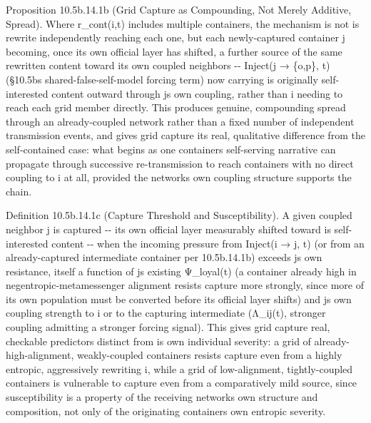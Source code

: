 \documentclass[
]{article}
\begin{document}
Proposition 10.5b.14.1b (Grid Capture as Compounding, Not Merely
Additive, Spread). Where r\_cont(i,t) includes multiple containers, the
mechanism is not is rewrite independently reaching each one, but each
newly-captured container j becoming, once its own official layer has
shifted, a further source of the same rewritten content toward its own
coupled neighbors -\/- Inject(j → \{o,p\}, t) (§10.5bs
shared-false-self-model forcing term) now carrying is originally
self-interested content outward through js own coupling, rather than i
needing to reach each grid member directly. This produces genuine,
compounding spread through an already-coupled network rather than a
fixed number of independent transmission events, and gives grid capture
its real, qualitative difference from the self-contained case: what
begins as one containers self-serving narrative can propagate through
successive re-transmission to reach containers with no direct coupling
to i at all, provided the networks own coupling structure supports the
chain.

Definition 10.5b.14.1c (Capture Threshold and Susceptibility). A given
coupled neighbor j is captured -\/- its own official layer measurably
shifted toward is self-interested content -\/- when the incoming
pressure from Inject(i → j, t) (or from an already-captured intermediate
container per 10.5b.14.1b) exceeds js own resistance, itself a function
of js existing Ψ\_loyal(t) (a container already high in
negentropic-metamessenger alignment resists capture more strongly, since
more of its own population must be converted before its official layer
shifts) and js own coupling strength to i or to the capturing
intermediate (Λ\_ij(t), stronger coupling admitting a stronger forcing
signal). This gives grid capture real, checkable predictors distinct
from is own individual severity: a grid of already-high-alignment,
weakly-coupled containers resists capture even from a highly entropic,
aggressively rewriting i, while a grid of low-alignment, tightly-coupled
containers is vulnerable to capture even from a comparatively mild
source, since susceptibility is a property of the receiving networks own
structure and composition, not only of the originating containers own
entropic severity.
\end{document}
